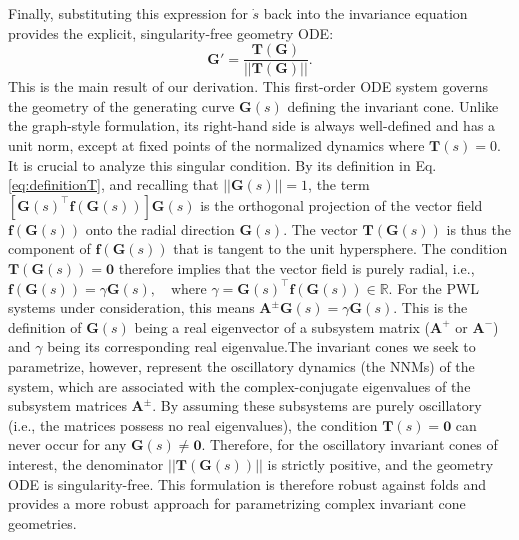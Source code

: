 \documentclass[a4paper,9pt,parskip=half,english]{article}
\theoremstyle{plain}
\theoremstyle{definition}
\newcommand{\T}{^{\!\top}} %
\newcommand{\vf}{\mathbf f}
\newcommand{\vA}{\mathbf A}
\newcommand{\vG}{\mathbf G}
\newcommand{\vT}{\mathbf T}
\newcommand{\vzero}{\bm{0}}
\begin{document}
Finally, substituting this expression for $\dot{s}$ back into the invariance equation provides the explicit, singularity-free geometry ODE:
\begin{equation}\label{eq:arclength_geomODE}
	\vG' = \frac{\vT(\vG)}{||\vT(\vG)||}.
\end{equation}
This is the main result of our derivation. This first-order ODE system governs the geometry of the generating curve $\vG(s)$ defining the invariant cone. Unlike the graph-style formulation, its right-hand side is always well-defined and has a unit norm, except at fixed points of the normalized dynamics where $\vT(s)=0$. It is crucial to analyze this singular condition. By its definition in Eq. \eqref{eq:definitionT}, and recalling that $||\vG(s)||=1$, the term $\left[ \vG(s)\T \vf(\vG(s)) \right] \vG(s)$ is the orthogonal projection of the vector field $\vf(\vG(s))$ onto the radial direction $\vG(s)$. The vector $\vT(\vG(s))$ is thus the component of $\vf(\vG(s))$ that is tangent to the unit hypersphere. The condition $\vT(\vG(s)) = \vzero$ therefore implies that the vector field is purely radial, i.e., $\vf(\vG(s)) = \gamma \vG(s), \quad \text{where } \gamma = \vG(s)\T \vf(\vG(s)) \in \mathbb{R}$. For the PWL systems under consideration, this means $\vA^\pm \vG(s) = \gamma \vG(s)$. This is the definition of $\vG(s)$ being a real eigenvector of a subsystem matrix ($\vA^+$ or $\vA^-$) and $\gamma$ being its corresponding real eigenvalue.The invariant cones we seek to parametrize, however, represent the oscillatory dynamics (the NNMs) of the system, which are associated with the complex-conjugate eigenvalues of the subsystem matrices $\vA^\pm$. By assuming these subsystems are purely oscillatory (i.e., the matrices possess no real eigenvalues), the condition $\vT(s) = \vzero$ can never occur for any $\vG(s) \neq \vzero$. Therefore, for the oscillatory invariant cones of interest, the denominator $||\vT(\vG(s))||$ is strictly positive, and the geometry ODE is singularity-free.
This formulation is therefore robust against folds and provides a more robust approach for parametrizing complex invariant cone geometries.
\end{document}
